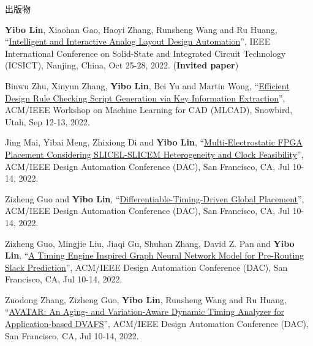 \begin{rSection}{出版物}
\begin{description}[font=\normalfont, rightmargin=2em]
\item[{[C67]}]{
        \textbf{Yibo Lin}, Xiaohan Gao, Haoyi Zhang, Runsheng Wang and Ru Huang, 
    ``\href{https://doi.org/10.1109/ICSICT55466.2022.9963217}{Intelligent and Interactive Analog Layout Design Automation}'', 
    IEEE International Conference on Solid-State and Integrated Circuit Technology (ICSICT), Nanjing, China, Oct 25-28, 2022.
    (\textbf{Invited paper})
}
            

\item[{[C66]}]{
        Binwu Zhu, Xinyun Zhang, \textbf{Yibo Lin}, Bei Yu and Martin Wong, 
    ``\href{https://doi.org/10.1145/3551901.3556494}{Efficient Design Rule Checking Script Generation via Key Information Extraction}'', 
    ACM/IEEE Workshop on Machine Learning for CAD (MLCAD), Snowbird, Utah, Sep 12-13, 2022.
    
}
            

\item[{[C65]}]{
        Jing Mai, Yibai Meng, Zhixiong Di and \textbf{Yibo Lin}, 
    ``\href{https://doi.org/10.1145/3489517.3530568}{Multi-Electrostatic FPGA Placement Considering SLICEL-SLICEM Heterogeneity and Clock Feasibility}'', 
    ACM/IEEE Design Automation Conference (DAC), San Francisco, CA, Jul 10-14, 2022.
    
}
            

\item[{[C64]}]{
        Zizheng Guo and \textbf{Yibo Lin}, 
    ``\href{https://doi.org/10.1145/3489517.3530486}{Differentiable-Timing-Driven Global Placement}'', 
    ACM/IEEE Design Automation Conference (DAC), San Francisco, CA, Jul 10-14, 2022.
    
}
            

\item[{[C63]}]{
        Zizheng Guo, Mingjie Liu, Jiaqi Gu, Shuhan Zhang, David Z. Pan and \textbf{Yibo Lin}, 
    ``\href{https://doi.org/10.1145/3489517.3530597}{A Timing Engine Inspired Graph Neural Network Model for Pre-Routing Slack Prediction}'', 
    ACM/IEEE Design Automation Conference (DAC), San Francisco, CA, Jul 10-14, 2022.
    
}
            

\item[{[C62]}]{
        Zuodong Zhang, Zizheng Guo, \textbf{Yibo Lin}, Runsheng Wang and Ru Huang, 
    ``\href{https://doi.org/10.1145/3489517.3530530}{AVATAR: An Aging- and Variation-Aware Dynamic Timing Analyzer for Application-based DVAFS}'', 
    ACM/IEEE Design Automation Conference (DAC), San Francisco, CA, Jul 10-14, 2022.
    
}
\end{description}
\end{rSection}
